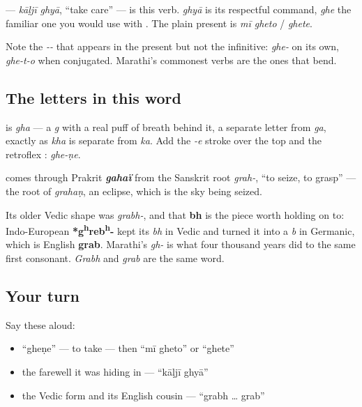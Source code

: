 \textbf{ } — \emph{kāḷjī ghyā}, \textquotedblleft{}take care\textquotedblright{} — is this verb. \textbf{} \emph{ghyā} is its respectful command, \textbf{} \emph{ghe} the familiar one you would use with \textbf{}. The plain present is \textbf{ } \emph{mī gheto} / \textbf{} \emph{ghete}.

Note the \emph{--} that appears in the present but not the infinitive: \emph{ghe-} on its own, \emph{ghe-t-o} when conjugated. Marathi's commonest verbs are the ones that bend.

\subsection*{The letters in this word}
\textbf{} is \emph{gha} — a \emph{g} with a real puff of breath behind it, a separate letter from \textbf{} \emph{ga}, exactly as \textbf{} \emph{kha} is separate from \textbf{} \emph{ka}. Add the \emph{-e} stroke over the top and the retroflex \textbf{}: \emph{ghe-ṇe}.

\begin{cousinweb}
\textbf{} comes through Prakrit \emph{\textbf{gahaï}} from the Sanskrit root \textbf{} \emph{grah-}, \textquotedblleft{}to seize, to grasp\textquotedblright{} — the root of \textbf{} \emph{grahaṇ}, an eclipse, which is the sky being seized.

Its older Vedic shape was \textbf{} \emph{grabh-}, and that \textbf{bh} is the piece worth holding on to: Indo-European \textbf{*g\textsuperscript{h}reb\textsuperscript{h}-} kept its \emph{bh} in Vedic and turned it into a \emph{b} in Germanic, which is English \textbf{grab}. Marathi's \emph{gh-} is what four thousand years did to the same first consonant. \emph{Grabh} and \emph{grab} are the same word.
\end{cousinweb}

\subsection*{Your turn}
Say these aloud:

\begin{itemize}
\raggedright
  \item \textquotedblleft{}gheṇe\textquotedblright{} — to take — then \textquotedblleft{}mī gheto\textquotedblright{} or \textquotedblleft{}ghete\textquotedblright{}
  \item the farewell it was hiding in — \textquotedblleft{}kāḷjī ghyā\textquotedblright{}
  \item the Vedic form and its English cousin — \textquotedblleft{}grabh … grab\textquotedblright{}
\end{itemize}

